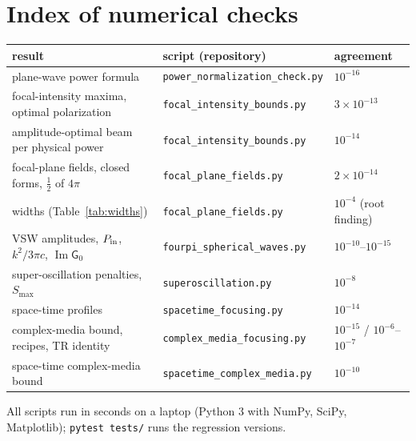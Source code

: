 \documentclass[11pt,letterpaper]{article}
\renewcommand{\Im}{\operatorname{Im}}
\newcommand{\code}[1]{\texttt{\small #1}}
\begin{document}
\section{Index of numerical checks}
\begin{center}
\small
\begin{tabular}{lll}
\toprule
result & script (repository) & agreement\\
\midrule
plane-wave power formula & \code{power\_normalization\_check.py} & $10^{-16}$\\
focal-intensity maxima, optimal polarization & \code{focal\_intensity\_bounds.py} & $3\times10^{-13}$\\
amplitude-optimal beam per physical power & \code{focal\_intensity\_bounds.py} & $10^{-14}$\\
focal-plane fields, closed forms, $\tfrac12$ of $4\pi$ & \code{focal\_plane\_fields.py} & $2\times10^{-14}$\\
widths (Table~\ref{tab:widths}) & \code{focal\_plane\_fields.py} & $10^{-4}$ (root finding)\\
VSW amplitudes, $P_{\rm in}$, $k^2/3\pi c$, $\Im\mathsf G_0$ & \code{fourpi\_spherical\_waves.py} & $10^{-10}$--$10^{-15}$\\
super-oscillation penalties, $S_{\max}$ & \code{superoscillation.py} & $10^{-8}$\\
space-time profiles & \code{spacetime\_focusing.py} & $10^{-14}$\\
complex-media bound, recipes, TR identity & \code{complex\_media\_focusing.py} & $10^{-15}$ / $10^{-6}$--$10^{-7}$\\
space-time complex-media bound & \code{spacetime\_complex\_media.py} & $10^{-10}$\\
\bottomrule
\end{tabular}
\end{center}
All scripts run in seconds on a laptop (Python 3 with NumPy, SciPy, Matplotlib); \code{pytest tests/} runs the regression versions.
\end{document}
